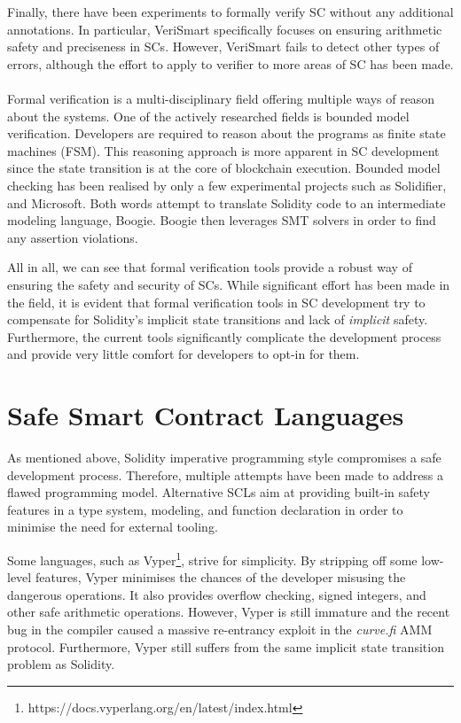\documentclass[oneside]{ecsproject}     %
\begin{document}
Finally, there have been experiments to formally verify SC without any additional annotations. In particular, VeriSmart specifically
focuses on ensuring arithmetic safety and preciseness in SCs\cite{so2019verismart}. However, VeriSmart fails to detect other types of errors, 
although the effort to apply to verifier to more areas of SC has been made.

\paragraph*{}
Formal verification is a multi-disciplinary field offering multiple ways of reason about the systems. One of the actively researched fields
is bounded model verification\cite{SMBC}. Developers are required to reason about the programs as finite state machines (FSM).
This reasoning approach is more apparent in SC development since the state transition is at the core of blockchain execution.
Bounded model checking has been realised by only a few experimental projects such as Solidifier\cite{solidifer}, and Microsoft\cite{azure}.
Both words attempt to translate Solidity code to an intermediate modeling language, Boogie\cite{boogie}. Boogie then leverages
SMT solvers in order to find any assertion violations.

All in all, we can see that formal verification tools provide a robust way of ensuring the safety and security of SCs. 
While significant effort has been made in the field, it is evident that formal verification tools in SC development
try to compensate for Solidity's implicit state transitions and lack of \textit{implicit} safety. 
Furthermore, the current tools significantly complicate the development process and provide very little comfort
for developers to opt-in for them.

\section{Safe Smart Contract Languages} \label{Chapter:SCL}

As mentioned above, Solidity imperative programming style compromises a safe development process. Therefore,
multiple attempts have been made to address a flawed programming model\cite{sc_survey}. Alternative SCLs aim at providing
built-in safety features in a type system, modeling, and function declaration in order to minimise the need for
external tooling. 

Some languages, such as Vyper\footnote{https://docs.vyperlang.org/en/latest/index.html}, strive for simplicity.
By stripping off some low-level features, Vyper minimises the chances of the developer misusing the dangerous operations.
It also provides overflow checking, signed integers, and other safe arithmetic operations. However, Vyper is still immature 
and the recent bug in the compiler caused a massive re-entrancy exploit in the \textit{curve.fi} AMM protocol\cite{curve}.
Furthermore, Vyper still suffers from the same implicit state transition problem as Solidity.
\end{document}
